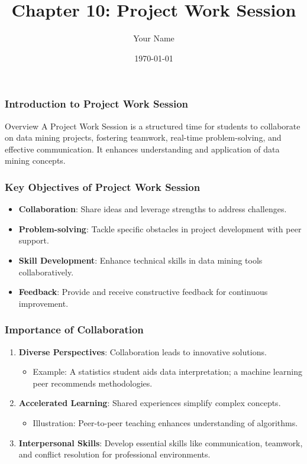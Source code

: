 \documentclass{beamer}
\title{Chapter 10: Project Work Session}
\author{Your Name}
\institute{Your Institution}
\date{\today}
\begin{document}
\frame{\titlepage}

\begin{frame}[fragile]
    \frametitle{Introduction to Project Work Session}
    \begin{block}{Overview}
    A Project Work Session is a structured time for students to collaborate on data mining projects, fostering teamwork, real-time problem-solving, and effective communication. It enhances understanding and application of data mining concepts.
    \end{block}
\end{frame}

\begin{frame}[fragile]
    \frametitle{Key Objectives of Project Work Session}
    \begin{itemize}
        \item \textbf{Collaboration}: Share ideas and leverage strengths to address challenges.
        \item \textbf{Problem-solving}: Tackle specific obstacles in project development with peer support.
        \item \textbf{Skill Development}: Enhance technical skills in data mining tools collaboratively.
        \item \textbf{Feedback}: Provide and receive constructive feedback for continuous improvement.
    \end{itemize}
\end{frame}

\begin{frame}[fragile]
    \frametitle{Importance of Collaboration}
    \begin{enumerate}
        \item \textbf{Diverse Perspectives}: Collaboration leads to innovative solutions.
              \begin{itemize}
                  \item Example: A statistics student aids data interpretation; a machine learning peer recommends methodologies.
              \end{itemize}
        \item \textbf{Accelerated Learning}: Shared experiences simplify complex concepts.
              \begin{itemize}
                  \item Illustration: Peer-to-peer teaching enhances understanding of algorithms.
              \end{itemize}
        \item \textbf{Interpersonal Skills}: Develop essential skills like communication, teamwork, and conflict resolution for professional environments.
    \end{enumerate}
\end{frame}
\end{document}
